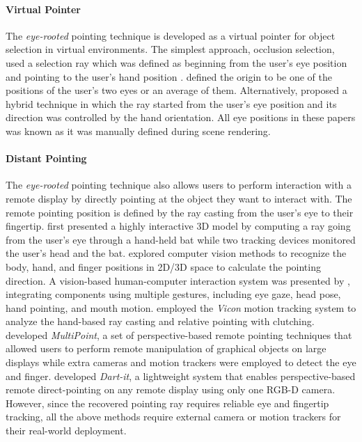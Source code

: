 \paragraph{Virtual Pointer} The \textit{eye-rooted} pointing technique is developed as a virtual pointer for object selection in virtual environments. The simplest approach, occlusion selection, used a selection ray which was defined as beginning from the user's eye position and pointing to the user's hand position \citep{Forsberg1996,Pierce1997}. \citet{Forsberg1996} defined the origin to be one of the positions of the user's two eyes or an average of them. Alternatively, \citet{Argelaguet2008} proposed a hybrid technique in which the ray started from the user's eye position and its direction was controlled by the hand orientation. All eye positions in these papers was known as it was manually defined during scene rendering.

\paragraph{Distant Pointing} The \textit{eye-rooted} pointing technique also allows users to perform interaction with a remote display by directly pointing at the object they want to interact with. The remote pointing position is defined by the ray casting from the user's eye to their fingertip.  
\citet*{Liang1994} first presented a highly interactive 3D model by computing a ray going from the user's eye through a hand-held bat while two tracking devices monitored the user's head and the bat. 
\citet{Nickel2003} explored computer vision methods to recognize the body, hand, and finger positions in 2D/3D space to calculate the pointing direction. A vision-based human-computer interaction system was presented by \citet{Reale2011}, integrating components using multiple gestures, including eye gaze, head pose, hand pointing, and mouth motion. 
\citet*{Vogel2005} employed the \textit{Vicon} motion tracking system to analyze the hand-based ray casting and relative pointing with clutching. 
\citet{Banerjee2012} developed \textit{MultiPoint}, a set of perspective-based remote pointing techniques that allowed users to perform remote manipulation of graphical objects on large displays while extra cameras and motion trackers were employed to detect the eye and finger. 
\citet{Huang2014} developed \textit{Dart-it}, a lightweight system that enables perspective-based remote direct-pointing on any remote display using only one RGB-D camera. However, since the recovered pointing ray requires reliable eye and fingertip tracking, all the above methods require external camera or motion trackers for their real-world deployment.

